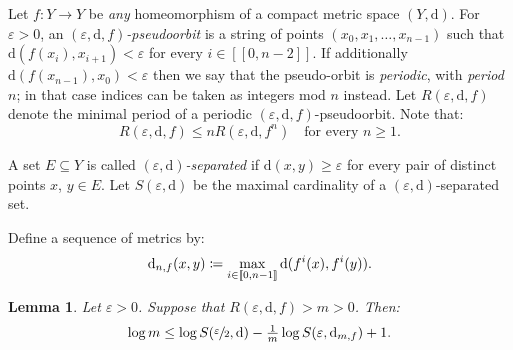 \documentclass[JEP,XML,SOM,Unicode]{cedram}
\newcommand{\ldbrack}{[\![}
\newcommand{\rdbrack}{]\!]}
\def\vcentcolon{\mathrel{\mathop\ordinarycolon}}
\providecommand\ordinarycolon{:}
\providecommand*\coloneqq{\vcentcolon\mathrel{\mkern-1.2mu}=}
\theoremstyle{plain}
\newtheorem{lemma}[theorem]{Lemma}
\theoremstyle{definition}
\newcommand{\dd}{\mathrm{d}}
\let\epsilon\varepsilon
\begin{document}
Let $f \colon Y \to Y$ be \emph{any} homeomorphism of a compact metric space $(Y,\dd)$.
For $\epsilon>0$, an \emph{$(\epsilon, \dd, f)$-pseudoorbit} is a string of points $(x_0,x_1, \dots, x_{n-1})$ such that
$\dd(f(x_i), x_{i+1})< \epsilon$ for every $i \in \ldbrack 0, n-2\rdbrack$.
If additionally $\dd(f (x_{n-1}), x_0)< \epsilon$ then we say that the pseudo-orbit is \emph{periodic}, with \emph{period} $n$; in that case indices can be taken as integers mod $n$ instead.
Let $R(\epsilon, \dd, f)$ denote the minimal period of a periodic $(\epsilon, \dd, f)$-pseudoorbit.
Note that:
\begin{equation}\label{e.R_power}
R(\epsilon, \dd, f) \le n R(\epsilon, \dd, f^n) \quad \text{for every $n \ge 1$.}
\end{equation}

A set $E \subseteq Y$ is called \emph{$(\epsilon, \dd)$-separated} if $\dd(x,y)\ge \epsilon$ for every pair of distinct points $x$, $y\in E$.
Let $S(\epsilon,\dd)$ be the maximal cardinality of a $(\epsilon, \dd)$-separated set.

Define a sequence of metrics by:
\[
\dd_{n,f}(x,y) \coloneqq \max_{i \in \ldbrack 0, n-1\rdbrack} \dd(f^i(x), f^i(y)).
\]

\begin{lemma}\label{l.BQ_estimate}
Let $\epsilon>0$.
Suppose that $R(\epsilon,\dd,f) > m > 0$.
Then:
\[
\log m \le \log S(\sfrac{\epsilon}{2}, \dd) - \tfrac{1}{m} \log S(\epsilon, \dd_{m,f}) + 1.
\]
\end{lemma}
\end{document}
